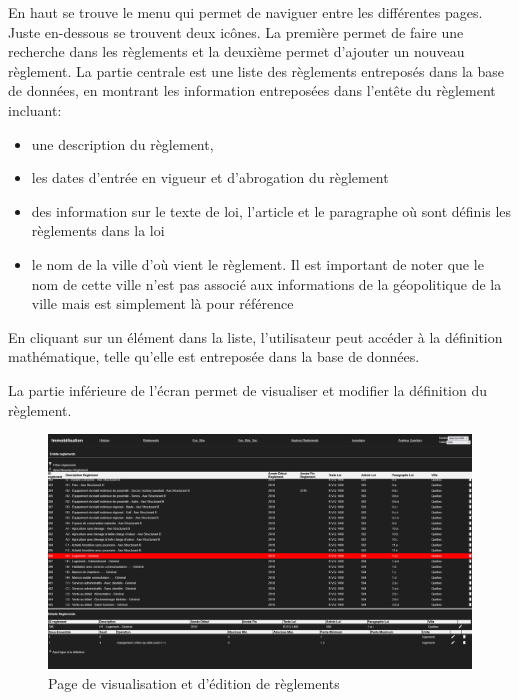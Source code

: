 En haut se trouve le menu qui permet de naviguer entre les différentes pages. Juste en-dessous se trouvent deux icônes. La première permet de faire une recherche dans les règlements et la deuxième permet d'ajouter un nouveau règlement. La partie centrale est une liste des règlements entreposés dans la base de données, en montrant les information entreposées dans l'entête du règlement incluant:
\begin{itemize}
    \item une description du règlement, 
    \item les dates d'entrée en vigueur et d'abrogation du règlement
    \item des information sur le texte de loi, l'article et le paragraphe où sont définis les règlements dans la loi
    \item le nom de la ville d'où vient le règlement. Il est important de noter que le nom de cette ville n'est pas associé aux informations de la géopolitique de la ville mais est simplement là pour référence
\end{itemize}
En cliquant sur un élément dans la liste, l'utilisateur peut accéder à la définition mathématique, telle qu'elle est entreposée dans la base de données.\par
La partie inférieure de l'écran permet de visualiser et modifier la définition du règlement.
\begin{landscape}
    \begin{figure}
        \centering
        \includegraphics[width=1\linewidth]{images/PageReglements.png}
        \caption{Page de visualisation et d'édition de règlements}
        \label{fig:page-reglements}
    \end{figure}
\end{landscape}
